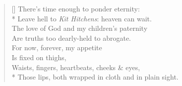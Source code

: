 \begin{verse}[\versewidth]
There's time enough to ponder eternity:\\*
\vin Leave hell to \textit{Kit Hitchens}: heaven can wait.\\
The love of God and my children's paternity\\
\vin Are truths too dearly-held to abrogate.\\
\vin \vin For now, forever, my appetite\\
\vin \vin \vin Is fixed on thighs,\\
\vin \vin \vin Waists, fingers, heartbeats, cheeks \& eyes,\\*
\vin \vin Those lips, both wrapped in cloth and in plain sight.
\end{verse}
